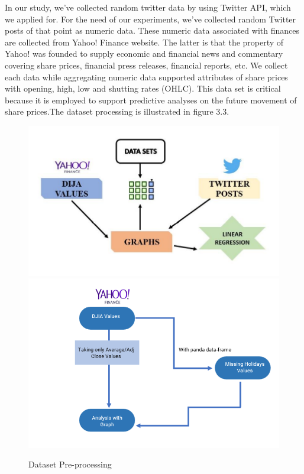In our study, we’ve collected random twitter data by using Twitter API, which we applied for. For the need of our experiments, we’ve collected random Twitter posts of that point as numeric data. These numeric data associated with finances are collected from Yahoo! Finance website. The latter is that the property of Yahoo! was founded to supply economic and financial news and commentary covering share prices, financial press releases, financial reports, etc. We collect each data while aggregating numeric data supported attributes of share prices with opening, high, low and shutting rates (OHLC). This data set is critical because it is employed to support predictive analyses on the future movement of share prices.The dataset processing is illustrated in figure 3.3. \\


\begin{figure}[H]
    \centering
    \includegraphics[scale=.65]{img3/Dataset Pre-processing.png}
    \includegraphics[scale=.9]{img3/Dataset Pre-processing2.png}
    \caption{Dataset Pre-processing}
    \label{fig:Dataset Pre-processing}
\end{figure}


